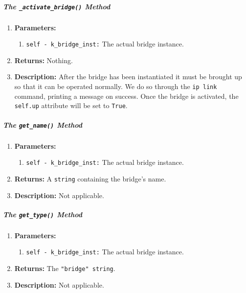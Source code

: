                     \subparagraph{The \texttt{\_activate\_bridge()} Method}
                        \begin{enumerate}
                            \item \textbf{Parameters:}
                            \begin{enumerate}
                                \item \texttt{self - k\_bridge\_inst:} The actual bridge instance.
                            \end{enumerate}
                            \item \textbf{Returns:} Nothing.
                            \item \textbf{Description:} After the bridge has been instantiated it must be brought up so that it can be operated normally. We do so through the \texttt{ip link} command, printing a message on success. Once the bridge is activated, the \texttt{self.up} attribute will be set to \texttt{True}.
                        \end{enumerate}

                    \subparagraph{The \texttt{get\_name()} Method}
                        \begin{enumerate}
                            \item \textbf{Parameters:}
                            \begin{enumerate}
                                \item \texttt{self - k\_bridge\_inst:} The actual bridge instance.
                            \end{enumerate}
                            \item \textbf{Returns:} A \texttt{string} containing the bridge's name.
                            \item \textbf{Description:} Not applicable.
                        \end{enumerate}

                    \subparagraph{The \texttt{get\_type()} Method}
                        \begin{enumerate}
                            \item \textbf{Parameters:}
                            \begin{enumerate}
                                \item \texttt{self - k\_bridge\_inst:} The actual bridge instance.
                            \end{enumerate}
                            \item \textbf{Returns:} The \texttt{"bridge" string}.
                            \item \textbf{Description:} Not applicable.
                        \end{enumerate}

